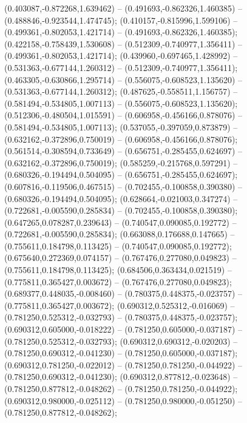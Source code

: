 (0.403087,-0.872268,1.639462) -- (0.491693,-0.862326,1.460385) -- (0.488846,-0.923544,1.474745);
 (0.410157,-0.815996,1.599106) -- (0.499361,-0.802053,1.421714) -- (0.491693,-0.862326,1.460385);
 (0.422158,-0.758439,1.530608) -- (0.512309,-0.740977,1.356411) -- (0.499361,-0.802053,1.421714);
 (0.439960,-0.697465,1.428992) -- (0.531363,-0.677144,1.260312) -- (0.512309,-0.740977,1.356411);
 (0.463305,-0.630866,1.295714) -- (0.556075,-0.608523,1.135620) -- (0.531363,-0.677144,1.260312);
 (0.487625,-0.558511,1.156757) -- (0.581494,-0.534805,1.007113) -- (0.556075,-0.608523,1.135620);
 (0.512306,-0.480504,1.015591) -- (0.606958,-0.456166,0.878076) -- (0.581494,-0.534805,1.007113);
 (0.537055,-0.397059,0.873879) -- (0.632162,-0.372896,0.750019) -- (0.606958,-0.456166,0.878076);
 (0.561514,-0.308594,0.733649) -- (0.656751,-0.285455,0.624697) -- (0.632162,-0.372896,0.750019);
 (0.585259,-0.215768,0.597291) -- (0.680326,-0.194494,0.504095) -- (0.656751,-0.285455,0.624697);
 (0.607816,-0.119506,0.467515) -- (0.702455,-0.100858,0.390380) -- (0.680326,-0.194494,0.504095);
 (0.628664,-0.021003,0.347274) -- (0.722681,-0.005590,0.285834) -- (0.702455,-0.100858,0.390380);
 (0.647265,0.078287,0.239643) -- (0.740547,0.090085,0.192772) -- (0.722681,-0.005590,0.285834);
 (0.663088,0.176688,0.147665) -- (0.755611,0.184798,0.113425) -- (0.740547,0.090085,0.192772);
 (0.675640,0.272369,0.074157) -- (0.767476,0.277080,0.049823) -- (0.755611,0.184798,0.113425);
 (0.684506,0.363434,0.021519) -- (0.775811,0.365427,0.003672) -- (0.767476,0.277080,0.049823);
 (0.689377,0.448035,-0.008460) -- (0.780375,0.448375,-0.023757) -- (0.775811,0.365427,0.003672);
 (0.690312,0.525312,-0.016069) -- (0.781250,0.525312,-0.032793) -- (0.780375,0.448375,-0.023757);
 (0.690312,0.605000,-0.018222) -- (0.781250,0.605000,-0.037187) -- (0.781250,0.525312,-0.032793);
 (0.690312,0.690312,-0.020203) -- (0.781250,0.690312,-0.041230) -- (0.781250,0.605000,-0.037187);
 (0.690312,0.781250,-0.022012) -- (0.781250,0.781250,-0.044922) -- (0.781250,0.690312,-0.041230);
 (0.690312,0.877812,-0.023648) -- (0.781250,0.877812,-0.048262) -- (0.781250,0.781250,-0.044922);
 (0.690312,0.980000,-0.025112) -- (0.781250,0.980000,-0.051250) -- (0.781250,0.877812,-0.048262);
